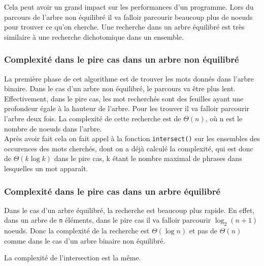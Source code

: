 \documentclass{article}
\begin{document}
        Cela peut avoir un grand impact sur les performances d'un programme.
        Lors du parcours de l'arbre non équilibré il va falloir parcourir beaucoup
        plus de noeuds pour trouver ce qu'on cherche. Une recherche dans un arbre
        équilibré est très similaire à une recherche dichotomique dans un ensemble.


        \subsubsection{Complexité dans le pire cas dans un arbre non équilibré}
        La première phase de cet algorithme est de trouver les mots donnés dans
        l'arbre binaire. Dans le cas d'un arbre non équilibré, le parcours va être
        plus lent. Effectivement, dans le pire cas, les mot recherchés sont des
        feuilles ayant une profondeur égale à la hauteur de l'arbre. Pour les
        trouver il va falloir parcourir l'arbre deux fois. La complexité de
        cette recherche est de $\Theta(n)$, où n est le nombre de noeuds dans
        l'arbre.\\

        Après avoir fait cela on fait appel à la fonction \texttt{intersect()}
        sur les ensembles des occurences des mots cherchés, dont on a déjà
        calculé la complexité, qui est donc de $\Theta(k\log{}k)$ dans le pire cas,
        k étant le nombre maximal de phrases dans lesquelles un mot apparaît.

        \subsubsection{Complexité dans le pire cas dans un arbre équilibré}
        Dans le cas d'un arbre équilibré, la recherche est beaucoup plus rapide.
        En effet, dans un arbre de \texttt{n} éléments, dans le pire cas il va falloir
        parcourir ${\log_2(n+1)}$ noeuds. Donc la complexité de la recherche
        est $\Theta(\log{}n)$ et pas de $\Theta(n)$ comme dans le cas d'un arbre
        binaire non équilibré.

        La complexité de l'intersection est la même.
\end{document}
